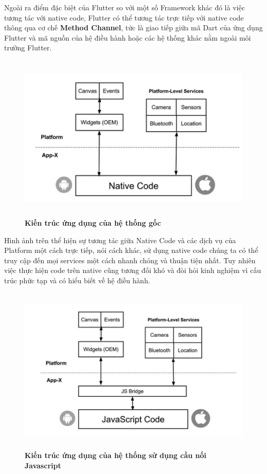 Ngoài ra điểm đặc biệt của Flutter so với một số Framework khác đó là việc tương tác với native code, Flutter có thể tương
tác trực tiếp với native code thông qua cơ chế \textbf{Method Channel}, tức là giao tiếp giữa mã Dart của ứng dụng Flutter 
và mã nguồn của hệ điều hành hoặc các hệ thống khác nằm ngoài môi trường Flutter. 

\begin{figure}[H]
  \centering
  \includegraphics[width=15cm,height=8cm]{Images/system/flutter_native_code.png}
  \caption[Kiến trúc ứng dụng của hệ thống gốc]{\bfseries \fontsize{12pt}{0pt}
  \selectfont Kiến trúc ứng dụng của hệ thống gốc}
  \label{flutter_native_code} %
\end{figure}

Hình ảnh trên thể hiện sự tương tác giữa Native Code và các dịch vụ của Platform một cách trực tiếp, nói cách khác, sử dụng
native code chúng ta có thể truy cập đến mọi services một cách nhanh chóng và thuận tiện nhất. Tuy nhiên việc thực hiện
code trên native cũng tương đối khó và đòi hỏi kinh nghiệm vì cấu trúc phức tạp và có hiểu biết về hệ điều hành.

\begin{figure}[H]
  \centering
  \includegraphics[width=15cm,height=8cm]{Images/system/flutter_JS.png}
  \caption[Kiến trúc ứng dụng của hệ thống sử dụng cầu nối Javascript]{\bfseries \fontsize{12pt}{0pt}
  \selectfont Kiến trúc ứng dụng của hệ thống sử dụng cầu nối Javascript}
  \label{flutter_JS} %
\end{figure}


